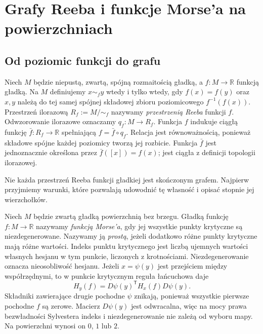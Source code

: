 \chapter{Grafy Reeba i funkcje Morse'a na powierzchniach}
\label{ch:tg-reeb}

\section{Od poziomic funkcji do grafu}
\label{sec:tg-reeb-def}

\begin{definicja}
Niech $M$ będzie niepustą, zwartą, spójną rozmaitością gładką,
a $f:M\to\mathbb R$ funkcją gładką. Na $M$ definiujemy
$x\sim_f y$ wtedy i tylko wtedy, gdy $f(x)=f(y)$
oraz $x,y$ należą do tej samej spójnej składowej
zbioru poziomicowego $f^{-1}(f(x))$.
Przestrzeń ilorazową $R_f:=M/{\sim_f}$ nazywamy
\emph{przestrzenią Reeba} funkcji $f$. Odwzorowanie
ilorazowe oznaczamy $q_f:M\to R_f$.
Funkcja $f$ indukuje ciągłą funkcję
$\bar f:R_f\to\mathbb R$ spełniającą
$f=\bar f\circ q_f$.
Relacja jest równoważnością, ponieważ składowe spójne
każdej poziomicy tworzą jej rozbicie. Funkcja $\bar f$
jest jednoznacznie określona przez $\bar f([x])=f(x)$;
jest ciągła z definicji topologii ilorazowej.
\end{definicja}

Nie każda przestrzeń Reeba funkcji gładkiej jest
skończonym grafem. Najpierw przyjmiemy warunki,
które pozwalają udowodnić tę własność i opisać
stopnie jej wierzchołków.

\begin{definicja}
Niech $M$ będzie zwartą gładką powierzchnią bez brzegu.
Gładką funkcję $f:M\to\mathbb R$ nazywamy \emph{funkcją Morse'a},
gdy jej wszystkie punkty krytyczne są niezdegenerowane.
Nazywamy ją \emph{prostą}, jeżeli dodatkowo różne punkty
krytyczne mają różne wartości. Indeks punktu krytycznego
jest liczbą ujemnych wartości własnych hesjanu w tym punkcie,
liczonych z krotnościami. Niezdegenerowanie oznacza
nieosobliwość hesjanu. Jeżeli $x=\psi(y)$ jest przejściem między współrzędnymi,
to w punkcie krytycznym reguła łańcuchowa daje
\[
 H_y(f)=D\psi(y)^{\mathsf T} H_x(f)D\psi(y).
\]
Składniki zawierające drugie pochodne $\psi$ znikają,
ponieważ wszystkie pierwsze pochodne $f$ są zerowe.
Macierz $D\psi(y)$ jest odwracalna, więc na mocy prawa
bezwładności Sylvestera indeks i niezdegenerowanie
nie zależą od wyboru mapy.
Na powierzchni wynosi on $0$, $1$ lub $2$.
\end{definicja}

